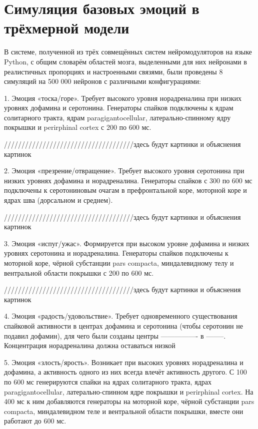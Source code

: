 \chapter{Симуляция базовых эмоций в трёхмерной модели}
\label{chap:results}
В системе, полученной из трёх совмещённых систем нейромодуляторов на языке Python, с общим словарём областей мозга, выделенными для них нейронами в реалистичных пропорциях и настроенными связями, были проведены 8 симуляций на 500 000 нейронов с различными конфигурациями:

1. Эмоция «тоска/горе». Требует высокого уровня норадреналина при низких уровнях дофамина и серотонина. Генераторы спайков подключены к ядрам солитарного тракта, ядрам paragigantocellular, латерально-спинному ядру покрышки и perirphinal cortex с 200 по 600 мс.

/////////////////////////////////////здесь будут картинки и объяснения картинок

2. Эмоция «презрение/отвращение». Требует высокого уровня серотонина при низких уровнях дофамина и норадреналина. Генераторы спайков с 300 по 600 мс подключены к серотониновым очагам в префронтальной коре, моторной коре и ядрах шва (дорсальном и среднем).

/////////////////////////////////////здесь будут картинки и объяснения картинок

3. Эмоция «испуг/ужас». Формируется при высоком уровне дофамина и низких уровнях серотонина и норадреналина. Генераторы спайков подключены к моторной коре, чёрной субстанции pars compacta, миндалевидному телу и вентральной области покрышки с 200 по 600 мс.

/////////////////////////////////////здесь будут картинки и объяснения картинок

4. Эмоция «радость/удовольствие». Требует одновременного существования спайковой активности в центрах дофамина и серотонина (чтобы серотонин не подавил дофамин), для чего были созданы центры ---------------- в --------. Концентрация норадреналина должна оставаться низкой

5. Эмоция «злость/ярость». Возникает при высоких уровнях норадреналина и  дофамина, а активность одного из них всегда влечёт активность другого. С 100 по 600 мс генерируются спайки на ядрах солитарного тракта, ядрах paragigantocellular, латерально-спинном ядре покрышки и perirphinal cortex. На 400 мс к ним добавляются генераторы на моторной коре, чёрной субстанции pars compacta, миндалевидном теле и вентральной области покрышки, вместе они работают до 600 мс.

